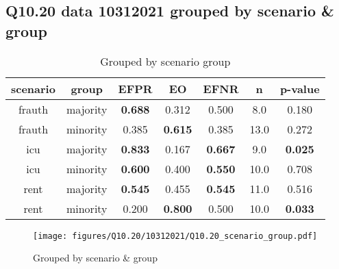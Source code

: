 \subsection{Q10.20 data 10312021 grouped by scenario \& group}

\begin{comment}
                        EFPR        EO      EFNR     n    pvalue
(frauth, majority)  0.687500  0.312500  0.500000   8.0  0.179712
(frauth, minority)  0.384615  0.615385  0.384615  13.0  0.272361
(icu, majority)     0.833333  0.166667  0.666667   9.0  0.025401
(icu, minority)     0.600000  0.400000  0.550000  10.0  0.708082
(rent, majority)    0.545455  0.454545  0.545455  11.0  0.516412
(rent, minority)    0.200000  0.800000  0.500000  10.0  0.033006
\end{comment}

\begin{table}[h]
    \centering
    \begin{tabular}{|c|c|c|c|c|c|c|}
        \hline
        scenario & group & EFPR & EO & EFNR & n & p-value\\
        \hline
        frauth & majority & \textbf{0.688} & 0.312 & 0.500 & 8.0 & 0.180\\
		frauth & minority & 0.385 & \textbf{0.615} & 0.385 & 13.0 & 0.272\\
		icu & majority & \textbf{0.833} & 0.167 & \textbf{0.667} & 9.0 & \textbf{0.025}\\
		icu & minority & \textbf{0.600} & 0.400 & \textbf{0.550} & 10.0 & 0.708\\
		rent & majority & \textbf{0.545} & 0.455 & \textbf{0.545} & 11.0 & 0.516\\
		rent & minority & 0.200 & \textbf{0.800} & 0.500 & 10.0 & \textbf{0.033}\\
		
        \hline
    \end{tabular}
    \caption{Grouped by scenario group}
    \label{tab:my_label}
\end{table}
\begin{figure}[h]
    \centering
    \texttt{[image: figures/Q10.20/10312021/Q10.20\_scenario\_group.pdf]}
    \caption{Grouped by scenario \& group}
    \label{fig:my_label}
\end{figure}
